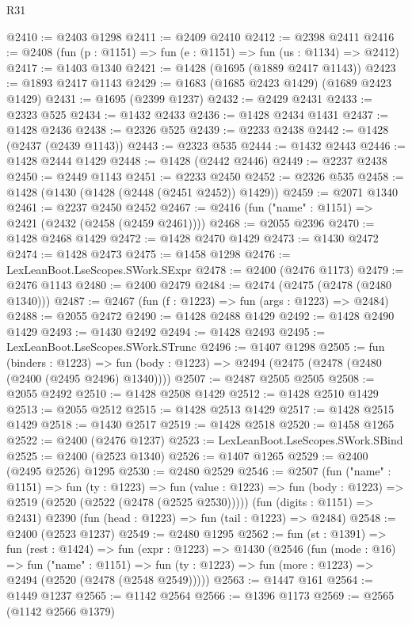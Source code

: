 \begin{lexlean}{R31}
\begin{coremodule}
@2410 := @2403 @1298
@2411 := @2409 @2410
@2412 := @2398 @2411
@2416 := @2408 (fun (p : @1151) => fun (e : @1151) => fun (us : @1134) => @2412)
@2417 := @1403 @1340
@2421 := @1428 (@1695 (@1889 @2417 @1143))
@2423 := @1893 @2417 @1143
@2429 := @1683 (@1685 @2423 @1429) (@1689 @2423 @1429)
@2431 := @1695 (@2399 @1237)
@2432 := @2429 @2431
@2433 := @2323 @525
@2434 := @1432 @2433
@2436 := @1428 @2434 @1431
@2437 := @1428 @2436
@2438 := @2326 @525
@2439 := @2233 @2438
@2442 := @1428 (@2437 (@2439 @1143))
@2443 := @2323 @535
@2444 := @1432 @2443
@2446 := @1428 @2444 @1429
@2448 := @1428 (@2442 @2446)
@2449 := @2237 @2438
@2450 := @2449 @1143
@2451 := @2233 @2450
@2452 := @2326 @535
@2458 := @1428 (@1430 (@1428 (@2448 (@2451 @2452)) @1429))
@2459 := @2071 @1340
@2461 := @2237 @2450 @2452
@2467 := @2416 (fun ("name" : @1151) => @2421 (@2432 (@2458 (@2459 @2461))))
@2468 := @2055 @2396
@2470 := @1428 @2468 @1429
@2472 := @1428 @2470 @1429
@2473 := @1430 @2472
@2474 := @1428 @2473
@2475 := @1458 @1298
@2476 := LexLeanBoot.LseScopes.SWork.SExpr
@2478 := @2400 (@2476 @1173)
@2479 := @2476 @1143
@2480 := @2400 @2479
@2484 := @2474 (@2475 (@2478 (@2480 @1340)))
@2487 := @2467 (fun (f : @1223) => fun (args : @1223) => @2484)
@2488 := @2055 @2472
@2490 := @1428 @2488 @1429
@2492 := @1428 @2490 @1429
@2493 := @1430 @2492
@2494 := @1428 @2493
@2495 := LexLeanBoot.LseScopes.SWork.STrunc
@2496 := @1407 @1298
@2505 := fun (binders : @1223) =>
  fun (body : @1223) => @2494 (@2475 (@2478 (@2480 (@2400 (@2495 @2496) @1340))))
@2507 := @2487 @2505 @2505
@2508 := @2055 @2492
@2510 := @1428 @2508 @1429
@2512 := @1428 @2510 @1429
@2513 := @2055 @2512
@2515 := @1428 @2513 @1429
@2517 := @1428 @2515 @1429
@2518 := @1430 @2517
@2519 := @1428 @2518
@2520 := @1458 @1265
@2522 := @2400 (@2476 @1237)
@2523 := LexLeanBoot.LseScopes.SWork.SBind
@2525 := @2400 (@2523 @1340)
@2526 := @1407 @1265
@2529 := @2400 (@2495 @2526) @1295
@2530 := @2480 @2529
@2546 := @2507
    (fun ("name" : @1151) =>
    fun (ty : @1223) =>
    fun (value : @1223) => fun (body : @1223) => @2519 (@2520 (@2522 (@2478 (@2525 @2530)))))
    (fun (digits : @1151) => @2431)
    @2390
    (fun (head : @1223) => fun (tail : @1223) => @2484)
@2548 := @2400 (@2523 @1237)
@2549 := @2480 @1295
@2562 := fun (st : @1391) =>
  fun (rest : @1424) =>
  fun (expr : @1223) =>
  @1430
    (@2546
      (fun (mode : @16) =>
      fun ("name" : @1151) =>
      fun (ty : @1223) => fun (more : @1223) => @2494 (@2520 (@2478 (@2548 @2549)))))
@2563 := @1447 @161
@2564 := @1449 @1237
@2565 := @1142 @2564
@2566 := @1396 @1173
@2569 := @2565 (@1142 @2566 @1379)

\end{coremodule}
\end{lexlean}
